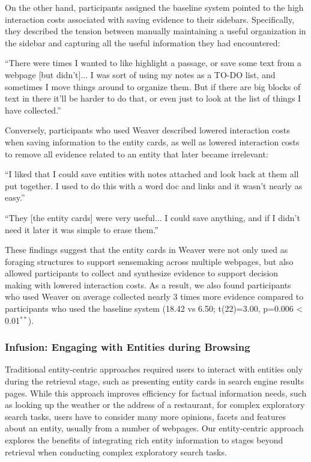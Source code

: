 On the other hand, participants assigned the baseline system pointed to the high interaction costs associated with saving evidence to their sidebars. Specifically, they described the tension between manually maintaining a useful organization in the sidebar and capturing all the useful information they had encountered:

\begin{tightquote}
``There were times I wanted to like highlight a passage, or save some text from a webpage [but didn't]... I was sort of using my notes as a TO-DO list, and sometimes I move things around to organize them. But if there are big blocks of text in there it'll be harder to do that, or even just to look at the list of things I have collected.''
\end{tightquote}

\noindent Conversely, participants who used Weaver described lowered interaction costs when saving information to the entity cards, as well as lowered interaction costs to remove all evidence related to an entity that later became irrelevant:

\begin{tightquote}
``I liked that I could save entities with notes attached and look back at them all put together. I used to do this with a word doc and links and it wasn't nearly as easy.''

``They [the entity cards] were very useful... I could save anything, and if I didn't need it later it was simple to erase them.''
\end{tightquote}

These findings suggest that the entity cards in Weaver were not only used as foraging structures to support sensemaking across multiple webpages, but also allowed participants to collect and synthesize evidence to support decision making with lowered interaction costs. As a result, we also found participants who used Weaver on average collected nearly 3 times more evidence compared to participants who used the baseline system (18.42 vs 6.50; t(22)=3.00, p=0.006 < 0.01$^{**}$).

\subsubsection{Infusion: Engaging with Entities during Browsing}

Traditional entity-centric approaches required users to interact with entities only during the retrieval stage, such as presenting entity cards in search engine results pages. While this approach improves efficiency for factual information needs, such as looking up the weather or the address of a restaurant, for complex exploratory search tasks, users have to consider many more opinions, facets and features about an entity, usually from a number of webpages. Our entity-centric approach explores the benefits of integrating rich entity information to stages beyond retrieval when conducting complex exploratory search tasks.

